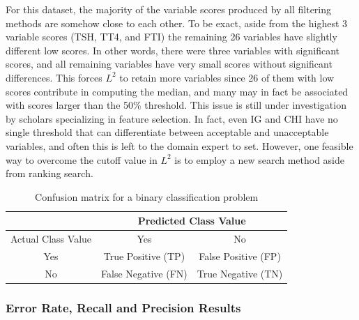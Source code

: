 \documentclass[review]{elsarticle}
\begin{document}
For this dataset, the majority of the variable scores produced by all filtering methods are somehow close to each other. To be exact, aside from the highest 3 variable scores (TSH, TT4, and FTI) the remaining 26 variables have slightly different low scores. In other words, there were three variables with significant scores, and all remaining variables have very small scores without significant differences. This forces $ L^2 $ to retain more variables since 26 of them with low scores contribute in computing the median, and many may in fact be associated with scores larger than the 50\% threshold.  This issue is still under investigation by scholars specializing in feature selection. In fact, even IG and CHI have no single threshold that can differentiate between acceptable and unacceptable variables, and often this is left to the domain expert to set. However, one feasible way to overcome the cutoff value in $ L^2 $ is to employ a new search method aside from ranking search.


\begin{table}[h]
	\centering
	\caption[short tbl2 table2]{Confusion matrix for a binary classification problem}
	\label{tab:confusion_matrix}
	\begin{tabular}{|c|c|c|}
		\hline 
		& \multicolumn{2}{c|}{ Predicted Class Value} \\ 
		\hline 
		Actual Class Value & Yes &  No \\ 
		\hline 
		Yes & True Positive (TP) & False Positive (FP) \\ 
		\hline 
		No & False Negative  (FN) & True Negative (TN) \\ 
		\hline
	\end{tabular} 
\end{table}

\subsubsection{Error Rate, Recall and Precision Results }
\end{document}
